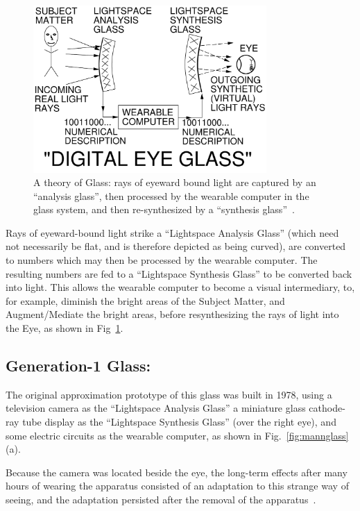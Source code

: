 \begin{figure}
\center
  \includegraphics[width=3.5in]{ch6/figs/Glass.pdf}
  \caption{A theory of Glass: rays of eyeward bound light are captured
           by an ``analysis glass'', then processed by the wearable computer
           in the glass system, and then re-synthesized by a
           ``synthesis glass''~\cite{mann2013freeglass}.}
  \label{fig:glass}
\end{figure}

Rays of eyeward-bound light strike a ``Lightspace Analysis Glass'' (which need not necessarily be flat, 
and is therefore depicted as being curved), are converted to numbers which may then be processed 
by the wearable computer. The resulting numbers are fed to a ``Lightspace Synthesis Glass'' to be 
converted back into light.  This allows the wearable computer to become a visual intermediary, to, for 
example, diminish the bright areas
of the Subject Matter, and Augment/Mediate the bright areas, before resynthesizing the rays of light 
into the Eye, as shown in Fig~\ref{fig:glass}.

\subsection{Generation-1 Glass:}
The original approximation prototype of this glass was built in 1978, using a television camera as the 
``Lightspace Analysis Glass'' a miniature glass cathode-ray tube display as the ``Lightspace Synthesis 
Glass'' (over the right eye), and some electric circuits as the wearable computer, as shown in 
Fig.~\ref{fig:mannglass} (a).

Because the camera was located beside the eye, the long-term effects after many hours of wearing 
the apparatus consisted of an adaptation to this strange way of seeing, and the adaptation persisted 
after the removal of the apparatus~\cite{mann1994mediated}. 

